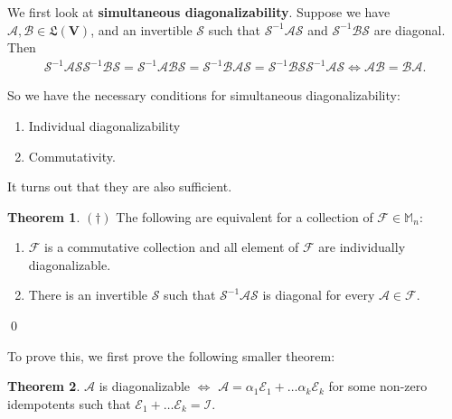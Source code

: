 \documentclass{book}
\theoremstyle{definition}
\newtheorem{thm}{Theorem}[section]
\newcommand{\F}{\mathcal{F}}
\newcommand{\V}{\mathbf{V}}
\newcommand{\A}{\mathcal{A}}
\newcommand{\B}{\mathcal{B}}
\newcommand{\E}{\mathcal{E}}
\newcommand{\s}{\mathcal{S}}
\newcommand{\LL}{\mathfrak{L}}
\begin{document}
We first look at \textbf{simultaneous diagonalizability}. Suppose we have $\A,\B \in \LL(\V)$, and an invertible $\mathcal{S}$ such that $\mathcal{S}^{-1}\A\mathcal{S}$ and $\mathcal{S}^{-1}\B\mathcal{S}$ are diagonal. Then 
\begin{align*}
\s^{-1}\A\s\s^{-1}\B\s = \s^{-1}\A\B\s = \s^{-1}\B\A\s = \s^{-1}\B\s\s^{-1}\A\s \iff \A\B = \B\A.
\end{align*}

So we have the necessary conditions for simultaneous diagonalizability:
\begin{enumerate}
	\item Individual diagonalizability
	\item Commutativity. 
\end{enumerate}

It turns out that they are also sufficient. 

\begin{thm}$(\dagger)$
	The following are equivalent for a collection of $\F \in \mathbb{M}_n$:
	\begin{enumerate}
		\item $\F$ is a commutative collection and all element of $\F$ are individually diagonalizable. 
		
		\item There is an invertible $\s$ such that $\s^{-1}\A\s$ is diagonal for every $\A \in \F$. 
	\end{enumerate}\qed
\end{thm}

To prove this, we first prove the following smaller theorem:

\begin{thm}
	$\A$ is diagonalizable $\iff$ $\A = \alpha_1\E_1 + \dots \alpha_k \E_k$ for some non-zero idempotents such that $\E_1 + \dots \E_k = \mathcal{I}$.
\end{thm}
\end{document}
